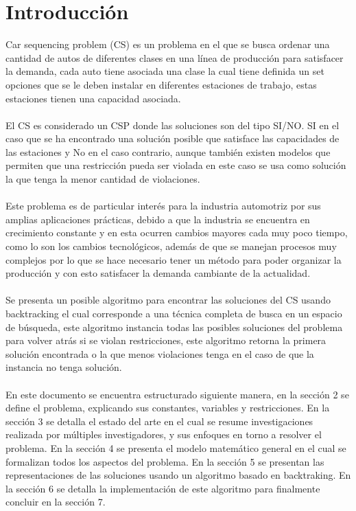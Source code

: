 \documentclass[letter, 10pt]{article}
\begin{document}
\section{Introducci\'on}
Car sequencing problem (CS) es un problema en el que se busca ordenar una cantidad de autos de diferentes clases en una l\'inea de producci\'on para satisfacer la demanda, cada auto tiene asociada una clase la cual tiene definida un set opciones que se le deben instalar en diferentes estaciones de trabajo, estas estaciones tienen una capacidad asociada.\\\\
El CS es considerado un CSP donde las soluciones son del tipo SI/NO. SI en el caso que se ha encontrado una soluci\'on posible que satisface las capacidades de las estaciones y No en el caso contrario, aunque tambi\'en existen modelos que permiten que una restricci\'on pueda ser violada en este caso se usa como soluci\'on la que tenga la menor cantidad de violaciones.
\\\\
Este problema es de particular inter\'es para la industria automotriz por sus amplias aplicaciones pr\'acticas, debido a que la industria se encuentra en crecimiento constante y en esta ocurren cambios mayores cada muy poco tiempo, como lo son los cambios tecnol\'ogicos, adem\'as de que se manejan procesos muy complejos por lo que se hace necesario tener un m\'etodo para poder organizar la producci\'on y con esto satisfacer la demanda cambiante de la actualidad. 
\\\\
Se presenta un posible algoritmo para encontrar las soluciones del CS usando backtracking el cual corresponde a una t\'ecnica completa de busca en un espacio de b\'usqueda, este algoritmo instancia todas las posibles soluciones del problema para volver atr\'as si se violan restricciones, este algoritmo retorna la primera soluci\'on encontrada o la que menos violaciones tenga en el caso de que la instancia no tenga soluci\'on.
\\\\
En este documento se encuentra estructurado siguiente manera, en la secci\'on 2 se define el problema, explicando sus constantes, variables y restricciones. En la secci\'on 3 se detalla el estado del arte en el cual se resume investigaciones realizada por m\'ultiples investigadores, y sus enfoques en torno a resolver el problema. En la secci\'on 4 se presenta el modelo matem\'atico general en el cual se formalizan todos los aspectos del problema. En la secci\'on 5 se presentan las representaciones de las soluciones usando un algoritmo basado en backtraking. En la secci\'on 6 se detalla la implementaci\'on de este algoritmo para finalmente concluir en la secci\'on 7.
\end{document}
